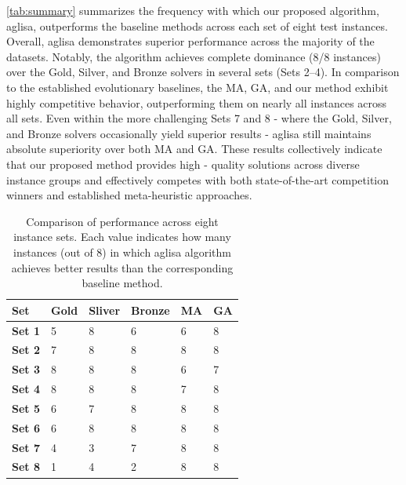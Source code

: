 \documentclass[]{interact}
\begin{document}
\autoref{tab:summary} summarizes the frequency with which our proposed algorithm, \gls{aglisa}, outperforms the baseline methods across each set of eight test instances. Overall, \gls{aglisa} demonstrates superior performance across the majority of the datasets. Notably, the algorithm achieves complete dominance (8/8 instances) over the Gold, Silver, and Bronze solvers in several sets (Sets 2–4). In comparison to the established evolutionary baselines, the MA, GA, and our method exhibit highly competitive behavior, outperforming them on nearly all instances across all sets. Even within the more challenging Sets 7 and 8 - where the Gold, Silver, and Bronze solvers occasionally yield superior results - \gls{aglisa} still maintains absolute superiority over both MA and GA. These results collectively indicate that our proposed method provides high - quality solutions across diverse instance groups and effectively competes with both state-of-the-art competition winners and established meta-heuristic approaches.

\begin{table}[htp]
\centering
\caption{Comparison of performance across eight instance sets. Each value indicates how many instances (out of 8) in which \gls{aglisa} algorithm achieves better results than the corresponding baseline method.}\label{tab:summary}
\begin{tabular}{|l|l|l|l|l|l|}
\hline
\textbf{Set}   & \textbf{Gold} & \textbf{Sliver} & \textbf{Bronze} & \textbf{MA} & \textbf{GA} \\ \hline
\textbf{Set 1} & 5             & 8               & 6               & 6           & 8           \\ \hline
\textbf{Set 2} & 7             & 8               & 8               & 8           & 8           \\ \hline
\textbf{Set 3} & 8             & 8               & 8               & 6           & 7           \\ \hline
\textbf{Set 4} & 8             & 8               & 8               & 7           & 8           \\ \hline
\textbf{Set 5} & 6             & 7               & 8               & 8           & 8           \\ \hline
\textbf{Set 6} & 6             & 8               & 8               & 8           & 8           \\ \hline
\textbf{Set 7} & 4             & 3               & 7               & 8           & 8           \\ \hline
\textbf{Set 8} & 1             & 4               & 2               & 8           & 8           \\ \hline
\end{tabular}%
\end{table}
\end{document}

